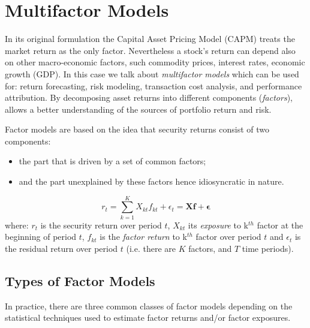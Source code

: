 \section{Multifactor Models}

In its original formulation the Capital Asset Pricing Model (CAPM) treats the market return as the only factor. Nevertheless a stock’s return can depend also on other macro-economic factors, such commodity prices, interest rates, economic growth (GDP). In this case we talk about \emph{multifactor models} which can be used for: return forecasting, risk modeling, transaction cost analysis, and performance attribution. 
By decomposing asset returns into different components (\emph{factors}), allows a better understanding of the sources of portfolio return and risk. 

Factor models are based on the idea that security returns consist of two components:
\begin{itemize}
	\tightlist
\item the part that is driven by a set of common factors;
\item and the part unexplained by these factors hence idiosyncratic in nature. 
\end{itemize}
\begin{equation}
r_{t} = \sum_{k=1}^{K} X_{kt} f_{kt} + \epsilon_{t} = \mathbf{Xf} + \boldsymbol{\epsilon}
\label{eq:multifactor}
\end{equation}
where: $r_{t}$ is the security return over period $t$, $X_{kt}$ its \emph{exposure} to k$^{th}$ factor at the beginning of period $t$, $f_{kt}$ is the \emph{factor return} to k$^{th}$ factor over period $t$ and $\epsilon_{t}$ is the residual return over period $t$ (i.e. there are $K$ factors, and $T$ time periods).

\subsection{Types of Factor Models}

In practice, there are three common classes of factor models depending on the statistical techniques used to estimate factor returns and/or factor exposures.

